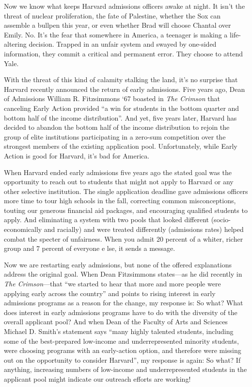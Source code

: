 
Now we know what keeps Harvard admissions officers awake at night. It isn't
the threat of nuclear proliferation, the fate of Palestine, whether the Sox
can assemble a bullpen this year, or even whether Brad will choose Chantal
over Emily. No. It's the fear that somewhere in America, a teenager is making
a life-altering decision. Trapped in an unfair system and swayed by one-sided
information, they commit a critical and permanent error. They choose to
attend Yale.

With the threat of this kind of calamity stalking the land, it's no surprise
that Harvard recently announced the return of early admissions. Five years
ago, Dean of Admissions William R. Fitzsimmons `67 boasted in \textit{The
Crimson} that canceling Early Action provided ``a win for students in the
bottom quarter and bottom half of the income distribution''. And yet, five
years later, Harvard has decided to abandon the bottom half of the income
distribution to rejoin the group of elite institutions participating in a
zero-sum competition over the strongest members of the existing application
pool. Unfortunately, while Early Action is good for Harvard, it's bad for
America.

When Harvard ended early admissions five years ago the stated goal was the
opportunity to reach out to students that might not apply to Harvard or any
other selective institution. The single application deadline gave admissions
officers more time to tour high schools in the fall, correcting common
misconceptions, touting our generous financial aid packages, and encouraging
qualified students to apply. And eliminating a system with two pools that
looked different (socio-economically and racially) and were treated
differently (admissions rates) helped combat the specter of unfairness. When
you admit 20 percent of a whiter, richer group and 7 percent of everyone
e lse, it sends a message.

Now we are restarting early admissions, but none of the offered explanations
address the original goal. When Dean Fitzsimmons states---as he did recently
in \textit{The Crimson}---that ``we started to hear that more and more people
were applying early across the country'' and points to rising interest in
early admissions programs as a reason for the change, my response is: So
what? What does interest in early admissions programs have to do with the
diversity of the overall applicant pool? And when Dean of the Faculty of Arts
and Sciences Michael D. Smith's statement says ``many highly talented
students, including some of the best-prepared low-income and underrepresented
minority students, were choosing programs with an early-action option, and
therefore were missing out on the opportunity to consider Harvard'', my
response is again: So what? If anything, increasing numbers of low-income and
underrepresented students in the applicant pool might indicate our outreach
efforts are working!

